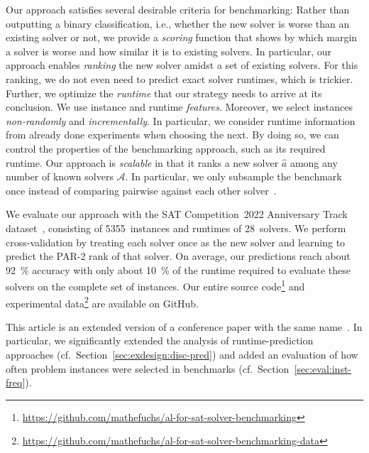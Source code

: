 \documentclass[sn-basic, Numbered]{sn-jnl} %
\begin{document}
Our approach satisfies several desirable criteria for benchmarking:
Rather than outputting a binary classification, i.e., whether the new solver is worse than an existing solver or not, we provide a \emph{scoring} function that shows by which margin a solver is worse and how similar it is to existing solvers.
In particular, our approach enables \emph{ranking} the new solver amidst a set of existing solvers.
For this ranking, we do not even need to predict exact solver runtimes, which is trickier.
Further, we optimize the \emph{runtime} that our strategy needs to arrive at its conclusion.
We use instance and runtime \emph{features}.
Moreover, we select instances \emph{non-randomly} and \emph{incrementally}.
In particular, we consider runtime information from already done experiments when choosing the next.
By doing so, we can control the properties of the benchmarking approach, such as its required runtime.
Our approach is \emph{scalable} in that it ranks a new solver $\hat{a}$ among any number of known solvers $\mathcal{A}$.
In particular, we only subsample the benchmark once instead of comparing pairwise against each other solver~\cite{MatriconAFSH21}.

We evaluate our approach with the SAT Competition~2022 Anniversary Track dataset~\cite{sat2022}, consisting of 5355~instances and runtimes of 28~solvers.
We perform cross-validation by treating each solver once as the new solver and learning to predict the PAR-2 rank of that solver.
On average, our predictions reach about \SI{92}{\%} accuracy with only about \SI{10}{\%} of the runtime required to evaluate these solvers on the complete set of instances.
Our entire source code\footnote{\url{https://github.com/mathefuchs/al-for-sat-solver-benchmarking}} and experimental data\footnote{\url{https://github.com/mathefuchs/al-for-sat-solver-benchmarking-data}} are available on GitHub.

This article is an extended version of a conference paper with the same name~\cite{fuchs2023active}.
In particular, we significantly extended the analysis of runtime-prediction approaches (cf.~Section~\ref{sec:exdesign:disc-pred}) and added an evaluation of how often problem instances were selected in benchmarks (cf.~Section~\ref{sec:eval:inst-freq}).
\end{document}
